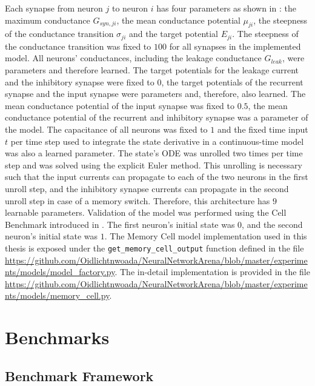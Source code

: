 \documentclass[draft,final]{vutinfth} %
\begin{document}
    Each synapse from neuron $j$ to neuron $i$ has four parameters as shown in : the maximum conductance $G_{syn,ji}$, the mean conductance potential $\mu_{ji}$, the steepness of the conductance transition $\sigma_{ji}$ and the target potential $E_{ji}$.
    The steepness of the conductance transition was fixed to $100$ for all synapses in the implemented model.
    All neurons' conductances, including the leakage conductance $G_{leak}$, were parameters and therefore learned.
    The target potentials for the leakage current and the inhibitory synapse were fixed to $0$, the target potentials of the recurrent synapse and the input synapse were parameters and, therefore, also learned.
    The mean conductance potential of the input synapse was fixed to $0.5$, the mean conductance potential of the recurrent and inhibitory synapse was a parameter of the model.
    The capacitance of all neurons was fixed to $1$ and the fixed time input $t$ per time step used to integrate the state derivative in a continuous-time model was also a learned parameter.
    The state's ODE was unrolled two times per time step and was solved using the explicit Euler method.
    This unrolling is necessary such that the input currents can propagate to each of the two neurons in the first unroll step, and the inhibitory synapse currents can propagate in the second unroll step in case of a memory switch.
    Therefore, this architecture has $9$ learnable parameters.
    Validation of the model was performed using the Cell Benchmark introduced in .
    The first neuron's initial state was $0$, and the second neuron's initial state was $1$.
    The Memory Cell model implementation used in this thesis is exposed under the \texttt{get\_memory\_cell\_output} function defined in the file \url{https://github.com/Oidlichtnwoada/NeuralNetworkArena/blob/master/experiments/models/model_factory.py}.
    The in-detail implementation is provided in the file \url{https://github.com/Oidlichtnwoada/NeuralNetworkArena/blob/master/experiments/models/memory_cell.py}.


    \chapter{Benchmarks}


    \section{Benchmark Framework} \label{benchmark_framework}
\end{document}
